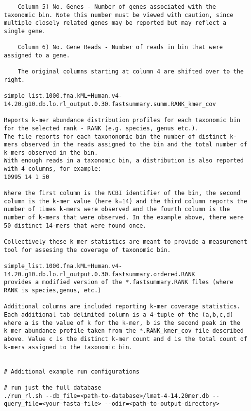 \documentclass[11pt]{article}
\begin{document}
\begin{verbatim}
    Column 5) No. Genes - Number of genes associated with the taxonomic bin. Note this number must be viewed with caution, since multiple closely related genes may be reported but may reflect a single gene.

    Column 6) No. Gene Reads - Number of reads in bin that were assigned to a gene.

    The original columns starting at column 4 are shifted over to the right.

simple_list.1000.fna.kML+Human.v4-14.20.g10.db.lo.rl_output.0.30.fastsummary.summ.RANK_kmer_cov

Reports k-mer abundance distribution profiles for each taxonomic bin for the selected rank - RANK (e.g. species, genus etc.).
The file reports for each taxononomic bin the number of distinct k-mers observed in the reads assigned to the bin and the total number of k-mers observed in the bin.  
With enough reads in a taxonomic bin, a distribution is also reported with 4 columns, for example:
10995 14 1 50

Where the first column is the NCBI identifier of the bin, the second column is the k-mer value (here k=14) and the third column reports the number of times k-mers were observed and the fourth column is the number of k-mers that were observed. In the example above, there were 50 distinct 14-mers that were found once.

Collectively these k-mer statistics are meant to provide a measurement tool for assesing the coverage of taxonomic bin. 

simple_list.1000.fna.kML+Human.v4-14.20.g10.db.lo.rl_output.0.30.fastsummary.ordered.RANK
provides a modified version of the *.fastsummary.RANK files (where RANK is species,genus, etc.)

Additional columns are included reporting k-mer coverage statistics.  Each additional tab delimited column is a 4-tuple of the (a,b,c,d) where a is the value of k for the k-mer, b is the second peak in the k-mer abundance profile taken from the *.RANK_kmer_cov file described above. Value c is the distinct k-mer count and d is the total count of k-mers assigned to the taxonomic bin.


# Additional example run configurations

# run just the full database
./run_rl.sh --db_file=<path-to-database>/lmat-4-14.20mer.db --query_file=<your-fasta-file> --odir=<path-to-output-directory>
\end{verbatim}
\end{document}
